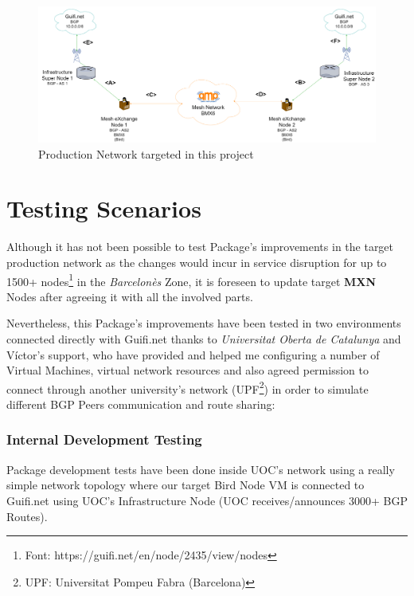 \begin{landscape}

\begin{figure}[ht!]
    \centering
    \includegraphics[width=\hsize]{images/targetnet}
    \caption{Production Network targeted in this project}
    \label{fig:tarnet}
\end{figure}
\end{landscape}
\newpage

\section{Testing Scenarios}
Although it has not been possible to test Package's improvements in the target production network as the changes would incur in service disruption for up to 1500+ nodes\footnote{Font: https://guifi.net/en/node/2435/view/nodes} in the \textit{Barcelon\`{e}s} Zone, it is foreseen to update target \textbf{MXN} Nodes after agreeing it with all the involved parts.

Nevertheless, this Package's improvements have been tested in two environments connected directly with Guifi.net thanks to  \textit{Universitat Oberta de Catalunya} and V\'{i}ctor's support, who have provided and helped me configuring a number of Virtual Machines, virtual network resources and also agreed permission to connect through another university's network (UPF\footnote{UPF: Universitat Pompeu Fabra (Barcelona)}) in order to simulate different BGP Peers communication and route sharing: 

\subsubsection{Internal Development Testing}
Package development tests have been done inside UOC's network using a really simple network topology where our target Bird Node VM is connected to Guifi.net using UOC's Infrastructure Node (UOC receives/announces 3000+ BGP Routes). 

